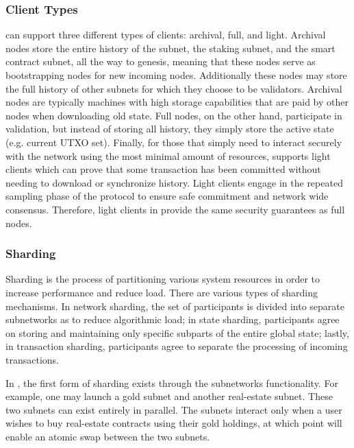 \documentclass[runningheads]{llncs}
\begin{document}
\subsubsection{Client Types}
\AVAPlatformName{} can support three different types of clients: archival, full, and light. 
Archival nodes store the entire history of the \AVATokenName{} subnet, the staking subnet, and the smart contract subnet, all the way to genesis, meaning that these nodes serve as bootstrapping nodes for new incoming nodes. Additionally these nodes may store the full history of other subnets for which they choose to be validators. Archival nodes are typically machines with high storage capabilities that are paid by other nodes when downloading old state. Full nodes, on the other hand, participate in validation, but instead of storing all history, they simply store the active state (e.g. current UTXO set). Finally, for those that simply need to interact securely with the network using the most minimal amount of resources, \AVAPlatformName{} supports light clients which can prove that some transaction has been committed without needing to download or synchronize history. 
Light clients engage in the repeated sampling phase of the protocol to ensure safe commitment and network wide consensus. Therefore, light clients in \AVAPlatformName{} provide the same security guarantees as full nodes. 

\subsubsection{Sharding}
Sharding is the process of partitioning various system resources in order to increase performance and reduce load. There are various types of sharding mechanisms. In network sharding, the set of participants is divided into separate subnetworks as to reduce algorithmic load; in state sharding, participants agree on storing and maintaining only specific subparts of the entire global state; lastly, in transaction sharding, participants agree to separate the processing of incoming transactions. 

In \AVAPlatformNameFirstRelease{}, the first form of sharding exists through the subnetworks functionality. For example, one may launch a gold subnet and another real-estate subnet. These two subnets can exist entirely in parallel. The subnets interact only when a user wishes to buy real-estate contracts using their gold holdings, at which point \AVAPlatformName{} will enable an atomic swap between the two subnets. 
\end{document}
